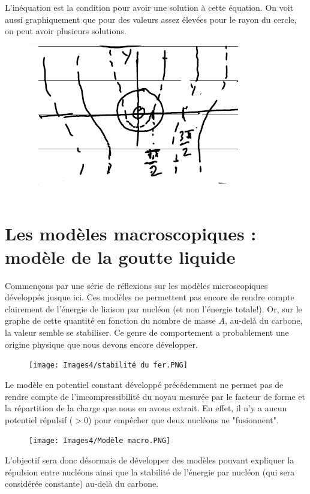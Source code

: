 L'inéquation est la condition pour avoir une solution à cette équation. On voit aussi graphiquement que pour des valeurs assez élevées pour le rayon du cercle, on peut avoir plusieurs solutions.
\begin{figure}[H]
    \centering
    \includegraphics[scale=1.2]{Images4/EqTranscendante.PNG}
\end{figure}











\section{Les modèles macroscopiques : modèle de la goutte liquide}


Commençons par une série de réflexions sur les modèles microscopiques développés jusque ici. Ces modèles ne permettent pas encore de rendre compte clairement de l'énergie de liaison par nucléon (et non l'énergie totale!). Or, sur le graphe de cette quantité en fonction du nombre de masse $A$, au-delà du carbone, la valeur semble se stabiliser. Ce genre de comportement a probablement une origine physique que nous devons encore développer.\\ 
\begin{figure}[H]
    \centering
    \texttt{[image: Images4/stabilité du fer.PNG]}
\end{figure}
Le modèle en potentiel constant développé précédemment ne permet pas de rendre compte de l'imcompressibilité du noyau mesurée par le facteur de forme et la répartition de la charge que nous en avons extrait. En effet, il n'y a aucun potentiel répulsif ($>0$) pour empêcher que deux nucléons ne "fusionnent".\\
\begin{figure}[H]
    \centering
    \texttt{[image: Images4/Modèle macro.PNG]}
\end{figure}
L'objectif sera donc désormais de développer des modèles pouvant expliquer la répulsion entre nucléons ainsi que la stabilité de l'énergie par nucléon (qui sera considérée constante) au-delà du carbone.


